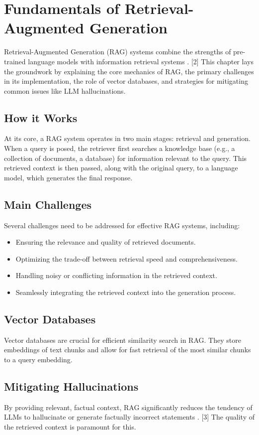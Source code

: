 \chapter{Fundamentals of Retrieval-Augmented Generation}
\label{chap:fundamentals_rag}

Retrieval-Augmented Generation (RAG) systems combine the strengths of pre-trained language models with information retrieval systems \autocite{rag_survey_2024_ralm}. [2] This chapter lays the groundwork by explaining the core mechanics of RAG, the primary challenges in its implementation, the role of vector databases, and strategies for mitigating common issues like LLM hallucinations.

\section{How it Works}
At its core, a RAG system operates in two main stages: retrieval and generation. When a query is posed, the retriever first searches a knowledge base (e.g., a collection of documents, a database) for information relevant to the query. This retrieved context is then passed, along with the original query, to a language model, which generates the final response.

\section{Main Challenges}
Several challenges need to be addressed for effective RAG systems, including:
\begin{itemize}
    \item Ensuring the relevance and quality of retrieved documents.
    \item Optimizing the trade-off between retrieval speed and comprehensiveness.
    \item Handling noisy or conflicting information in the retrieved context.
    \item Seamlessly integrating the retrieved context into the generation process.
\end{itemize}

\section{Vector Databases}
Vector databases are crucial for efficient similarity search in RAG. They store embeddings of text chunks and allow for fast retrieval of the most similar chunks to a query embedding.

\section{Mitigating Hallucinations}
By providing relevant, factual context, RAG significantly reduces the tendency of LLMs to hallucinate or generate factually incorrect statements \autocite{rag_prompt_eng_guide}. [3] The quality of the retrieved context is paramount for this.